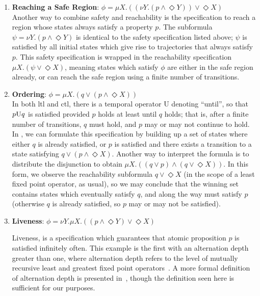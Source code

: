 \begin{enumerate}[label = (\roman*)]
    \item \textbf{Reaching a Safe Region}: $\phi = \mu X.((\nu Y.(p \land \Diamond Y)) \lor \Diamond X)$\\
    Another way to combine safety and reachability is the specification to reach a region whose states always satisfy a property $p$. The subformula ${\psi = \nu Y.(p \land \Diamond Y)}$ is identical to the safety specification listed above; $\psi$ is satisfied by all initial states which give rise to trajectories that always satisfy $p$. This safety specification is wrapped in the reachability specification ${\mu X.(\psi \lor \Diamond X)}$, meaning states which satisfy $\phi$ are either in the safe region already, or can reach the safe region using a finite number of transitions.

    \item \textbf{Ordering}: $\phi = \mu X.(q \lor (p \land \Diamond X))$\\
    In both \gls{ltl} and \gls{ctl}, there is a temporal operator \textsc{U} denoting ``until'', so that $p \textsc{U} q$ is satisfied provided $p$ holds at least until $q$ holds; that is, after a finite number of transitions, $q$ must hold, and $p$ may or may not continue to hold. In \mucalc{}, we can formulate this specification by building up a set of states where either $q$ is already satisfied, or $p$ is satisfied and there exists a transition to a state satisfying ${q \lor (p \land \Diamond X)}$. Another way to interpret the formula is to distribute the disjunction to obtain ${\mu X.((q \lor p) \land (q \lor \Diamond X))}$. In this form, we observe the reachability subformula ${q \lor \Diamond X}$ (in the scope of a least fixed point operator, as usual), so we may conclude that the winning set contains states which eventually satisfy $q$, and along the way must satisfy $p$ (otherwise $q$ is already satisfied, so $p$ may or may not be satisfied).

    \item \textbf{Liveness}: $\phi = \nu Y. \mu X.((p \land \Diamond Y) \lor \Diamond X)$

    Liveness, is a specification which guarantees that atomic proposition $p$ is satisfied infinitely often. This example is the first with an alternation depth greater than one, where alternation depth refers to the level of mutually recursive least and greatest fixed point operators~\cite{Wilke2001}. A more formal definition of alternation depth is presented in~\cite{Cleaveland1993}, though the definition seen here is sufficient for our purposes.


\end{enumerate}

